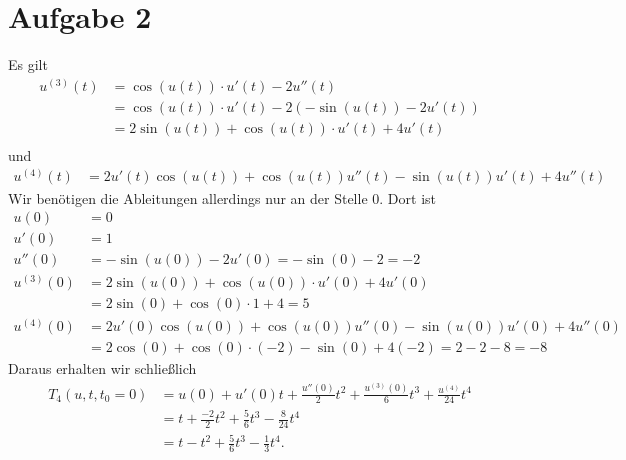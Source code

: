 \documentclass{article}
\theoremstyle{definition}
\begin{document}
\section*{Aufgabe 2}
Es gilt
\begin{align*}
	u^{(3)}(t) &= \cos(u(t)) \cdot u'(t) - 2u''(t)\\
	&= \cos(u(t)) \cdot u'(t) - 2(-\sin(u(t))-2u'(t))\\
	&= 2 \sin(u(t)) + \cos(u(t))\cdot u'(t) +4 u'(t)\\
\end{align*}
und
\begin{align*}
	u^{(4)}(t) &= 2u'(t)\cos(u(t)) + \cos(u(t))u''(t) - \sin(u(t))u'(t) + 4u''(t)
\end{align*}
Wir benötigen die Ableitungen allerdings nur an der Stelle $0$. Dort ist
\begin{align*}
	u(0) &= 0\\
	u'(0) &= 1\\
	u''(0) &= - \sin(u(0)) - 2u'(0) = -\sin(0) - 2 = -2\\
	u^{(3)}(0) &= 2 \sin(u(0)) + \cos(u(0))\cdot u'(0) +4 u'(0)\\
	&= 2\sin(0) + \cos(0)\cdot 1 + 4 = 5\\
	u^{(4)}(0) &= 2u'(0)\cos(u(0)) + \cos(u(0))u''(0) - \sin(u(0))u'(0) + 4u''(0)\\
	&= 2\cos(0) + \cos(0)\cdot (-2) - \sin(0) + 4(-2) = 2 -2 -8 = -8
\end{align*}
Daraus erhalten wir schließlich
\begin{align*}
	T_4(u,t, t_0 = 0) &= u(0) + u'(0)t + \frac{u''(0)}{2}t^2 + \frac{u^{(3)}(0)}{6}t^3 + \frac{u^{(4)}}{24}t^4\\
	&= t + \frac{-2}{2}t^2 + \frac{5}{6}t^3 -\frac{8}{24}t^4\\
	&= t - t^2 + \frac{5}{6}t^3 - \frac{1}{3}t^4.
\end{align*}
\end{document}
